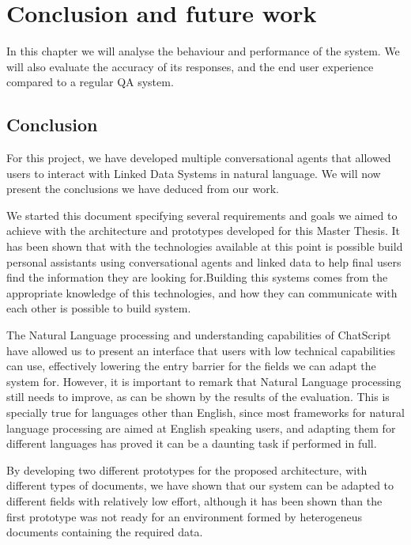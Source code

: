 \chapter{Conclusion and future work}
\label{chap:conclusion}


\begin{chapterintro}

In this chapter we will analyse the behaviour and performance of the system. We will also evaluate the accuracy of its responses, and the end user experience compared to a regular \ac{QA} system.
 
\end{chapterintro}

\cleardoublepage

\section{Conclusion}

For this project, we have developed multiple conversational agents that allowed users to interact with Linked Data Systems in natural language. We will now present the conclusions we have deduced from our work.

We started this document specifying several requirements and goals we aimed to achieve with the architecture and prototypes developed for this Master Thesis. It has been shown that with the technologies available at this point is possible build personal assistants using conversational agents and linked data to help final users find the information they are looking for.Building this systems comes from the appropriate knowledge of this technologies, and how they can communicate with each other is possible to build system. 

The Natural Language processing and understanding capabilities of ChatScript have allowed us to present an interface that users with low technical capabilities can use, effectively lowering the entry barrier for the fields we can adapt the system for. However, it is important to remark that Natural Language processing still needs to improve, as can be shown by the results of the evaluation. This is specially true for languages other than English, since most frameworks for natural language processing are aimed at English speaking users, and adapting them for different languages has proved it can be a daunting task if performed in full.

By developing two different prototypes for the proposed architecture, with different types of documents, we have shown that our system can be adapted to different fields with relatively low effort, although it has been shown than the first prototype was not ready for an environment formed by heterogeneus documents containing the required data.

